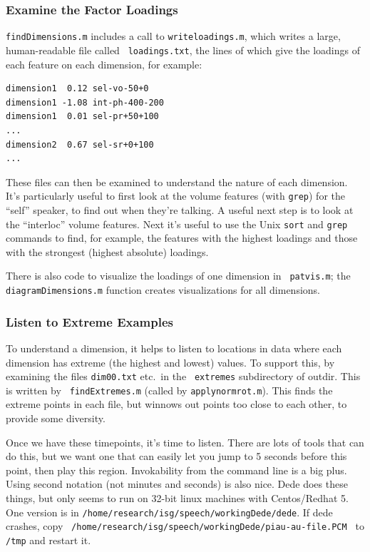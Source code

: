 \documentclass[11pt]{article}
\begin{document}
\subsubsection{Examine the Factor Loadings}

{\tt findDimensions.m} includes a call to {\tt writeloadings.m}, which
writes a large, human-readable file called {\tt
  loadings.txt}, the lines of which give the loadings of each feature on each
dimension, for example:

\begin{verbatim}
dimension1  0.12 sel-vo-50+0
dimension1 -1.08 int-ph-400-200
dimension1  0.01 sel-pr+50+100
...
dimension2  0.67 sel-sr+0+100  
...
\end{verbatim}

These files can then be examined to understand the nature of each
dimension.  It's particularly useful to first look at the volume features (with
{\tt grep}) for the ``self'' speaker, to find out when they're
talking.  A useful next step is to look at the ``interloc'' volume
features.  Next it's useful to use the Unix {\tt sort} and {\tt grep}
commands to find, for example, the features with the highest loadings
and those with the strongest (highest absolute) loadings.  

There is also code to visualize the loadings of one dimension in {\tt
  patvis.m};  the {\tt diagramDimensions.m} function creates
visualizations for all dimensions.


\subsubsection{Listen to Extreme Examples}

To understand a dimension, it helps to listen to locations in data
where each dimension has extreme (the highest and lowest) values.  To
support this, by examining the files {\tt dim00.txt} etc.\ in the {\tt
  extremes} subdirectory of outdir.  This is written by {\tt
  findExtremes.m} (called by {\tt applynormrot.m}).  This finds the
extreme points in each file, but winnows out points too close to each
other, to provide some diversity.

Once we have these timepoints, it's time to listen.  There are lots of
tools that can do this, but we want one that can easily let you jump
to 5 seconds before this point, then play this region.  Invokability
from the command line is a big plus.  Using second notation (not
minutes and seconds) is also nice.  Dede does these things, but only
seems to run on 32-bit linux machines with Centos/Redhat 5. One
version is in {\tt /home/research/isg/speech/workingDede/dede}.  If
dede crashes, copy {\tt
  /home/research/isg/speech/workingDede/piau-au-file.PCM } to {\tt
  /tmp} and restart it.
\end{document}
